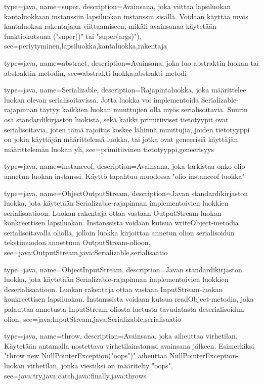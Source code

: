 {
	type=java,
	name=super,
	description={Avainsana, joka viittaa lapsiluokan kantaluokkaan instanssiin lapsiluokan
instanssin sisällä. Voidaan käyttää myös kantaluokan rakentajaan viittaamiseen, mikäli
avainsanaa käytetään funktiokutsuna ("super()" tai "super(args)")},
	see={periytyminen,lapsiluokka,kantaluokka,rakentaja}
}

{
	type=java,
	name=abstract,
	description={Avainsana, joka luo abstraktin luokan tai abstraktin metodin},
	see={abstrakti luokka,abstrakti metodi}
}

{
	type=java,
	name=Serializable,
	description={Rajapintaluokka, joka määrittelee luokan olevan serialisoitavissa. Jotta luokka
voi implementoida Serializable-rajapinnan täytyy kaikkien luokan muuttujien olla myös
serialisoitavia. Suurin osa standardikirjaston luokista, sekä kaikki primitiiviset tietotyypit
ovat serialisoitavia, joten tämä rajoitus koskee lähinnä muuttujia, joiden tietotyyppi on jokin
käyttäjän määrittelemä luokka, tai jotka ovat geneerisiä käyttäjän määrittelemän luokan yli},
	see={primitiivinen tietotyyppi,geneerisyys}
}

{
	type=java,
	name=instanceof,
	description={Avainsana, joka tarkistaa onko olio annetun luokan instanssi. Käyttö tapahtuu
muodossa "olio instanceof luokka"}
}

{
	type=java,
	name=ObjectOutputStream,
	description={Javan standardikirjaston luokka, jota käytetään Serializable-rajapinnan
implementoivien luokkien serialisaatioon. Luokan rakentaja ottaa vastaan OutputStream-luokan
konkreettisen lapsiluokan. Instanssista voidaan kutsua writeObject-metodia serialisoitavalla
oliolla, jolloin luokka kirjoittaa annetun olion serialisoidun tekstimuodon annettuun
OutputStream-olioon},
	see={java:OutputStream,java:Serializable,serialisaatio}
}

{
	type=java,
	name=ObjectInputStream,
	description={Javan standardikirjaston luokka, jota käytetään Serializable-rajapinnan
implementoivien luokkien deserialisaatioon. Luokan rakentaja ottaa vastaan InputStream-luokan
konkreettisen lapsiluokan. Instanssista voidaan kutsua readObject-metodia, joka palauttaa
annetusta InputStream-oliosta luetusta tavudatasta deserialisoidun olion},
	see={java:InputStream,java:Serializable,serialisaatio}
}

{
	type=java,
	name=throw,
	description={Avainsana, joka aiheuttaa virhetilan. Käytetään antamalla nostettava
virhetilainstanssi avainsana jälkeen. Esimerkiksi "throw new NullPointerException("oops")"
aiheuttaa NullPointerException-luokan virhetilan, jonka viestiksi on määritelty "oops"},
	see={java:try,java:catch,java:finally,java:throws}
}

